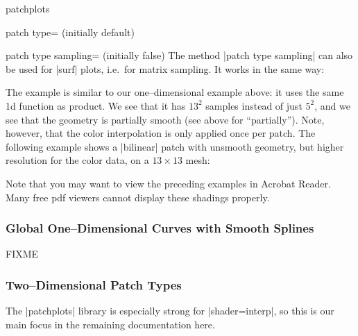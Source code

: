 {\begin{pgfplotslibrary}{patchplots}
\begin{pgfplotskey}{patch type= (initially default)}
\begin{pgfplotskey}{patch type sampling= (initially false)}
	The method |patch type sampling| can also be used for |surf| plots, i.e.\ for matrix sampling. It works in the same way:
\begin{codeexample}[]
\end{codeexample}
	The example is similar to our one--dimensional example above: it uses the same 1d function as product. We see that it has $13^2$ samples instead of just $5^2$, and we see that the geometry is partially smooth (see above for ``partially''). Note, however, that the color interpolation is only applied once per patch. The following example shows a |bilinear| patch with unsmooth geometry, but higher resolution for the color data, on a $13\times13$ mesh:
\begin{codeexample}[]
\end{codeexample}
	Note that you may want to view the preceding examples in Acrobat Reader. Many free pdf viewers cannot display these shadings properly.
\end{pgfplotskey}

\subsubsection{Global One--Dimensional Curves with Smooth Splines}
FIXME

\subsubsection{Two--Dimensional Patch Types}
	The |patchplots| library is especially strong for |shader=interp|, so this is our main focus in the remaining documentation here.


\end{pgfplotskey}
\end{pgfplotslibrary}}
